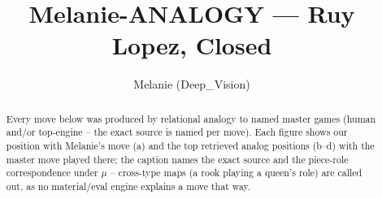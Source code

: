 \documentclass[11pt]{article}
\title{Melanie-ANALOGY — Ruy Lopez, Closed}
\author{Melanie (Deep\_Vision)}
\date{}
\begin{document}
\maketitle

\begin{abstract}Every move below was produced by relational analogy to named master games (human and/or top-engine -- the exact source is named per move). Each figure shows our position with Melanie's move (a) and the top retrieved analog positions (b--d) with the master move played there; the caption names the exact source and the piece-role correspondence under $\mu$ -- cross-type maps (a rook playing a queen's role) are called out, as no material/eval engine explains a move that way.\end{abstract}

\begin{figure}[p]\centering
\begin{subfigure}{0.46\textwidth}\centering
\resizebox{\linewidth}{!}{%
\newchessgame
\chessboard[
  setfen={r1bqk2r/2p1bppp/p1np1n2/1p2p3/4P2P/1B3N2/PPPP1PP1/RNBQR1K1 b kq - 0 8},
  showmover=false,
  pgfstyle=straightmove, color=movearrow, markmove={e8-g8}
]}
\caption{}
\end{subfigure}\hfill
\begin{subfigure}{0.46\textwidth}\centering
\resizebox{\linewidth}{!}{%
\newchessgame
\chessboard[
  setfen={r1bqk2r/2ppbppp/p1n2n2/1p2p3/4P3/1B3N2/PPPP1PPP/RNBQR1K1 b kq - 1 7},
  showmover=false,
  pgfstyle=straightmove, color=movearrow, markmove={e8-g8}
]}
\caption{}
\end{subfigure}
\\[4pt]
\begin{subfigure}{0.46\textwidth}\centering
\resizebox{\linewidth}{!}{%
\newchessgame
\chessboard[
  setfen={r1bqk2r/2ppbppp/p1n2n2/1p2p3/4P3/1B3N2/PPPP1PPP/RNBQR1K1 b kq - 1 7},
  showmover=false,
  pgfstyle=straightmove, color=movearrow, markmove={e8-g8}
]}
\caption{}
\end{subfigure}\hfill
\begin{subfigure}{0.46\textwidth}\centering
\resizebox{\linewidth}{!}{%
\newchessgame
\chessboard[
  setfen={r1bqk2r/2ppbppp/p1n2n2/1p2p3/4P3/1B3N2/PPPP1PPP/RNBQR1K1 b kq - 1 7},
  showmover=false,
  pgfstyle=straightmove, color=movearrow, markmove={e8-g8}
]}
\caption{}
\end{subfigure}

\end{figure}
\end{document}
